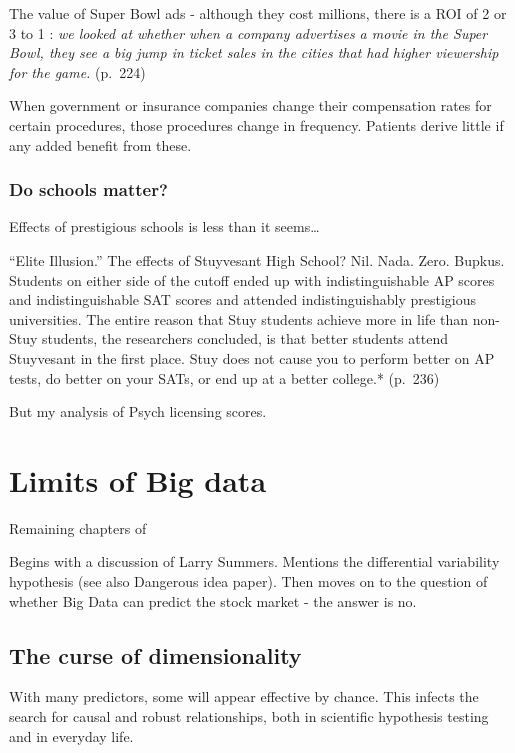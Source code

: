 \documentclass[]{book}
\theoremstyle{definition}
\theoremstyle{definition}
\theoremstyle{definition}
\theoremstyle{remark}
\begin{document}
The value of Super Bowl ads - although they cost millions, there is a
ROI of 2 or 3 to 1 : \emph{we looked at whether when a company
advertises a movie in the Super Bowl, they see a big jump in ticket
sales in the cities that had higher viewership for the game.} (p.~224)

When government or insurance companies change their compensation rates
for certain procedures, those procedures change in frequency. Patients
derive little if any added benefit from these.

\subsection{Do schools matter?}\label{do-schools-matter}

Effects of prestigious schools is less than it seems\ldots{}

``Elite Illusion.'' The effects of Stuyvesant High School? Nil. Nada.
Zero. Bupkus. Students on either side of the cutoff ended up with
indistinguishable AP scores and indistinguishable SAT scores and
attended indistinguishably prestigious universities. The entire reason
that Stuy students achieve more in life than non-Stuy students, the
researchers concluded, is that better students attend Stuyvesant in the
first place. Stuy does not cause you to perform better on AP tests, do
better on your SATs, or end up at a better college.* (p.~236)

But my analysis of Psych licensing scores.

\chapter{Limits of Big data}\label{limits-of-big-data}

Remaining chapters of \citet{stephens2017everybody}

Begins with a discussion of Larry Summers. Mentions the differential
variability hypothesis (see also Dangerous idea paper). Then moves on to
the question of whether Big Data can predict the stock market - the
answer is no.

\section{The curse of dimensionality}\label{the-curse-of-dimensionality}

With many predictors, some will appear effective by chance. This infects
the search for causal and robust relationships, both in scientific
hypothesis testing and in everyday life.
\end{document}
